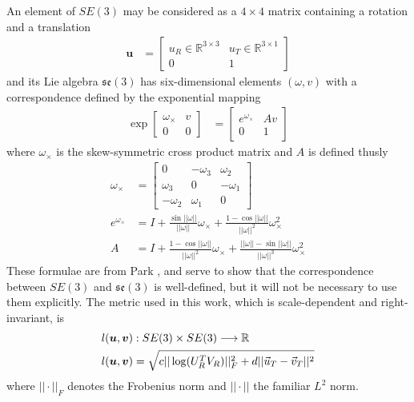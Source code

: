 \documentclass[letterpaper, 10 pt, conference]{ieeeconf}  %
\newcommand\mat[2]{\ensuremath{\left[\begin{array}{#1}#2\end{array}\right]}}
\def\xmat{\uppercase}    \def\xmatstr{in uppercase}
\def\xvec{\vec}          \def\xvecstr{with an arrow}
\def\xse{\bm}            \def\xsestr{in boldface}
\begin{document}
An element of $SE(3)$ may be considered as a $4 \times 4$ matrix containing a rotation and a translation
\begin{align}
  \xse{u} &= \mat{c|c}{ u_R \in \mathbb{R}^{3 \times 3} & u_T \in \mathbb{R}^{3 \times 1} \\\hline 0 & 1 }
\end{align}
and its Lie algebra $\mathfrak{se}(3)$ has six-dimensional elements $(\omega, v)$ with a correspondence defined by the exponential mapping
\begin{align}
  \exp{\mat{c|c}{ \omega_\times & v \\\hline 0 & 0 }} &= \mat{c|c}{ e^{\omega_\times} & Av \\\hline 0 & 1}
\end{align}
where $\omega_\times$ is the skew-symmetric cross product matrix and $A$ is defined thusly
\begin{align}
  \omega_\times &= \mat{ccc}{ 0 & -\omega_3 & \omega_2 \\ \omega_3 & 0 & -\omega_1 \\ -\omega_2 & \omega_1 & 0 } \\
  e^{\omega_\times} &= I + \frac{\sin||\omega||}{||\omega||} \omega_\times + \frac{1 - \cos{||\omega||}}{||\omega||^2} \omega_\times^2 \\
  A &= I + \frac{1 - \cos{||\omega||}}{||\omega||^2} \omega_\times + \frac{||\omega|| - \sin{||\omega||}}{||\omega||^3} \omega_\times^2
\end{align}
These formulae are from Park \cite{Park1995}, and serve to show that the correspondence between $SE(3)$ and $\mathfrak{se}(3)$ is well-defined, but it will not be necessary to use them explicitly. The metric used in this work, which is scale-dependent and right-invariant, is
\begin{align}
  l&(\xse{u},\xse{v}) : SE(3) \times SE(3) \longrightarrow \mathbb{R} \\
  l&(\xse{u},\xse{v}) = \sqrt{c ||\log(\xmat{u}_R^T \xmat{v}_R)||_F^2 + d ||\xvec{u}_T - \xvec{v}_T||^2} \nonumber
\end{align}
where $||\cdot||_F$ denotes the Frobenius norm and $||\cdot||$ the familiar $L^2$ norm.
\end{document}
